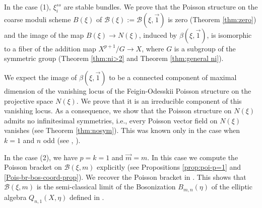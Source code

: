 \documentclass[reqno]{amsart}
\theoremstyle{definition}
\theoremstyle{remark}
\newcommand{\sB}{\mathscr{B}}
\newcommand{\sN}{\mathscr{N}}
\newcommand{\am}{\overrightarrow{m}}
\newcommand{\aone}{\overrightarrow{1}}
\numberwithin{equation}{section}
\begin{document}
In the case (1), $\xi_i^{ss}$ are stable bundles. We prove that the Poisson structure on the coarse moduli scheme $B(\xi)$ of $\sB(\xi):=\sB(\xi,\aone)$ is zero (Theorem \ref{thm:zero}) and the image of 
the map $B(\xi)\to N(\xi)$, induced by $\beta(\xi,\aone)$, is isomorphic to a fiber of the addition map $X^{p+1}/G\to X$, where $G$ is a subgroup of the symmetric group (Theorem \ref{thm:ni>2} and Theorem \ref{thm:general ni}). 

We expect the image of $\beta(\xi,\aone)$ to be a connected component  of maximal dimension of the vanishing locus of the Feigin-Odesskii Poisson structure on the projective space  $N(\xi)$. 
We prove that it is an irreducible component of this vanishing locus.  
As a consequence, we show that the Poisson structure on $N(\xi)$ admits no infinitesimal symmetries, i.e., every Poisson vector field on $N(\xi)$ vanishes (see Theorem \ref{thm:nosym}). 
This was known only in the case when $k=1$ and $n$ odd (see \cite[Prop.\ 15.1]{Polishchuk}, \cite[Thm.\ 4.6]{Pym-Schedler}).

In the case (2), we have $p=k=1$ and $\am=m$. In this case we compute the Poisson bracket on $\sB(\xi,m)$ explicitly (see Propositions \ref{prop:poi-p=1} and 
\ref{Pois-br-bos-coord-prop}). 
We recover the Poisson bracket in \cite[Section 2.5]{Ode02}. This shows that $\sB(\xi,m)$ is the semi-classical limit of the Bosonization $B_{m,n}(\eta)$ of the elliptic algebra $Q_{n,1}(X,\eta)$ 
defined in \cite[Section 2.3]{Ode02}. 
\end{document}
